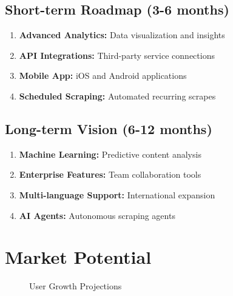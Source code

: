 \documentclass[12pt,a4paper]{report}
\begin{document}
\subsection{Short-term Roadmap (3-6 months)}

\begin{enumerate}
    \item \textbf{Advanced Analytics:} Data visualization and insights
    \item \textbf{API Integrations:} Third-party service connections
    \item \textbf{Mobile App:} iOS and Android applications
    \item \textbf{Scheduled Scraping:} Automated recurring scrapes
\end{enumerate}

\subsection{Long-term Vision (6-12 months)}

\begin{enumerate}
    \item \textbf{Machine Learning:} Predictive content analysis
    \item \textbf{Enterprise Features:} Team collaboration tools
    \item \textbf{Multi-language Support:} International expansion
    \item \textbf{AI Agents:} Autonomous scraping agents
\end{enumerate}

\section{Market Potential}

\begin{figure}[H]
    \centering
    \caption{User Growth Projections}
    \label{fig:growth-projection}
\end{figure}
\end{document}
